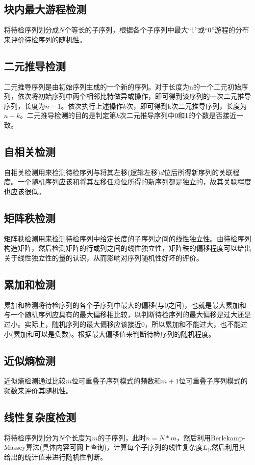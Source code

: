 \documentclass[12pt,a4paper]{article}%
\begin{document}
    \subsection{块内最大游程检测}
    将待检序列划分成$N$个等长的子序列，根据各个子序列中最大“1”或“0”游程的分布来评价待检序列的随机性。

    \subsection{二元推导检测}
    二元推导序列是由初始序列生成的一个新的序列。对于长度为n的一个二元初始序列，依次将初始序列中两个相邻比特做异或操作，即可得到该序列的一次二元推导序列，长度为$n-1$。依次执行上述操作$k$次，即可得到k次二元推导序列，长度为$n-k$。二元推导检测的目的是判定第$k$次二元推导序列中0和1的个数是否接近一致。

    \subsection{自相关检测}
    自相关检测用来检测待检序列与将其左移(逻辑左移)$d$位后所得新序列的关联程度。一个随机序列应该和将其左移任意位所得的新序列都是独立的，故其关联程度也应该很低。

    \subsection{矩阵秩检测}
    矩阵秩检测用来检测待检序列中给定长度的子序列之间的线性独立性。由待检序列构造矩阵，然后检测矩阵的行或列之间的线性独立性，矩阵秩的偏移程度可以给出关于线性独立性的量的认识，从而影响对序列随机性好坏的评价。

    \subsection{累加和检测}
    累加和检测将待检序列的各个子序列中最大的偏移(与0之间)，也就是最大累加和与一个随机序列应具有的最大偏移相比较，以判断待检序列的最大偏移是过大还是过小。实际上，随机序列的最大偏移应该接近0，所以累加和不能过大，也不能过小(累加和可以是负数)。根据最大偏移值来判断待检序列的随机程度。

    \subsection{近似熵检测}
    近似熵检测通过比较$m$位可重叠子序列模式的频数和$m+1$位可重叠子序列模式的频数来评价其随机性。

    \subsection{线性复杂度检测}
    将待检序列划分为$N$个长度为$m$的子序列，此时$n=N*m$，然后利用Berlekamp-Massey算法(具体内容可网上查询)，计算每个子序列的线性复杂度$L_i$,然后利用其给出的统计值来进行随机性判断。
\end{document}
